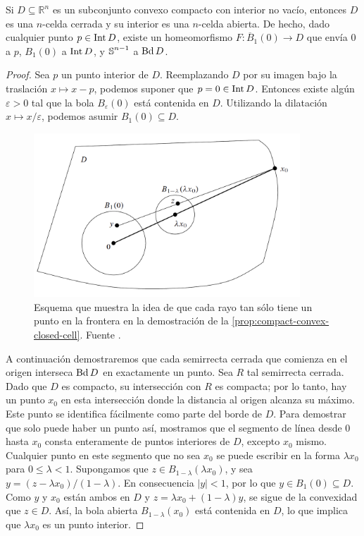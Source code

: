 \begin{proposicion}
	\label{prop:compact-convex-closed-cell} Si $D \subseteq \mathbb{R}^{n}$ es un subconjunto
	convexo compacto con interior no vacío, entonces $D$ es una $n$-celda cerrada
	y su interior es una $n$-celda abierta. De hecho, dado cualquier punto
	$p \in \operatorname{Int} D$, existe un homeomorfismo $F : \overline{B}_{1}(0) \to D$ que
	envía $0$ a $p$, $B_{1}(0)$ a $\operatorname{Int} D$, y $\operatorname{\mathbb{S}}^{n-1}$ a $\operatorname{Bd} D$.
\end{proposicion}
\begin{proof}
	Sea $p$ un punto interior de $D$. Reemplazando $D$ por su imagen bajo la
	traslación $x \mapsto x - p$, podemos suponer que $p = 0 \in \operatorname{Int} D$.
	Entonces existe algún $\varepsilon > 0$ tal que la bola $B_{\varepsilon}(0)$
	está contenida en $D$. Utilizando la dilatación $x \mapsto x/\varepsilon$,
	podemos asumir $B_{1}(0) \subseteq D$.
	\begin{figure}
		\centering
		\includegraphics[width=10cm]{img/proof-cell.png}
		\caption{Esquema que muestra la idea de que cada rayo tan sólo tiene un
			punto en la frontera en la demostración de la
			\autoref{prop:compact-convex-closed-cell}. Fuente \cite{lee2010introduction}.}
	\end{figure}
	A continuación demostraremos que cada semirrecta cerrada que comienza en el origen
	interseca $\operatorname{Bd} D$ en exactamente un punto. Sea $R$ tal semirrecta cerrada. Dado
	que $D$ es compacto, su intersección con $R$ es compacta; por lo tanto, hay un
	punto $x_{0}$ en esta intersección donde la distancia al origen alcanza su
	máximo. Este punto se identifica fácilmente como parte del borde de $D$. Para
	demostrar que solo puede haber un punto así, mostramos que el segmento de línea
	desde $0$ hasta $x_{0}$ consta enteramente de puntos interiores de $D$,
	excepto $x_{0}$ mismo. Cualquier punto en este segmento que no sea $x_{0}$ se puede
	escribir en la forma $\lambda x_{0}$ para $0 \leq \lambda < 1$. Supongamos que
	$z \in B_{1-\lambda}(\lambda x_{0})$, y sea $y = (z - \lambda x_{0})/(1 - \lambda)$.
	En consecuencia $|y| < 1$, por lo que $y \in B_{1}(0) \subseteq D$. Como $y$ y
	$x_{0}$ están ambos en $D$ y $z = \lambda x_{0} + (1 - \lambda)y$, se sigue de
	la convexidad que $z \in D$. Así, la bola abierta $B_{1-\lambda}(x_{0})$ está contenida
	en $D$, lo que implica que $\lambda x_{0}$ es un punto interior.
	

\end{proof}
